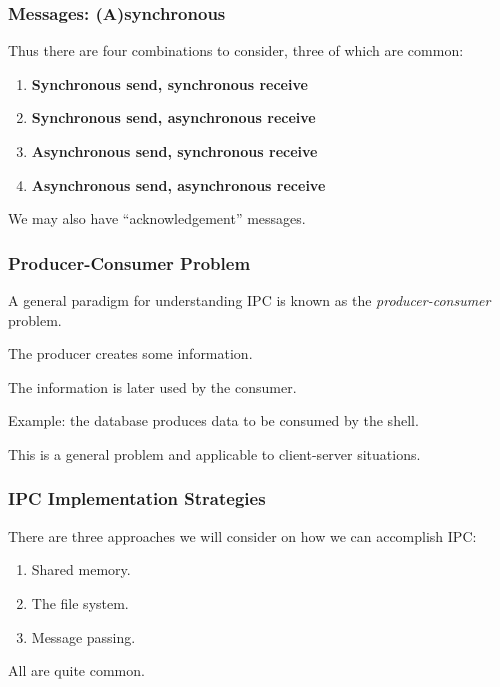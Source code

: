 \begin{frame}
	\frametitle{Messages: (A)synchronous}

	Thus there are four combinations to consider, three of which are common:

	\begin{enumerate}
		\item \textbf{Synchronous send, synchronous receive}
		\item \textbf{Synchronous send, asynchronous receive}
		\item \textbf{Asynchronous send, synchronous receive}
		\item \textbf{Asynchronous send, asynchronous receive}
	\end{enumerate}

	We may also have ``acknowledgement'' messages.

\end{frame}

\begin{frame}
	\frametitle{Producer-Consumer Problem}

	A general paradigm for understanding IPC is known as the \textit{producer-consumer} problem.

	The \alert{producer} creates some information.

	The information is later used by the \alert{consumer}.

	Example: the database produces data to be consumed by the shell.

	This is a general problem and applicable to client-server situations.

\end{frame}

\begin{frame}
	\frametitle{IPC Implementation Strategies}

	There are three approaches we will consider on how we can accomplish IPC:
	\begin{enumerate}
		\item Shared memory.
		\item The file system.
		\item Message passing.
	\end{enumerate}

	All are quite common.

\end{frame}


